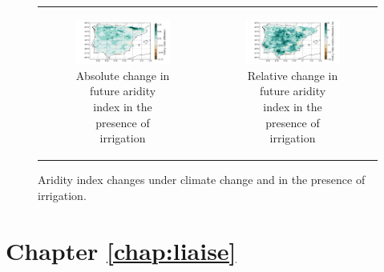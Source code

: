 \begin{figure}[htbp]
\begin{tabular}{cc}
        \begin{subfigure}[b]{0.5\textwidth}
            \caption{Absolute change in future aridity index in the presence of irrigation}
            \includegraphics[width=\textwidth]{images/chap4/future/diffmap_aridity_index_futirr.png}
        \end{subfigure} &
        \begin{subfigure}[b]{0.5\textwidth}
            \caption{Relative change in future aridity index in the presence of irrigation}
            \includegraphics[width=\textwidth]{images/chap4/future/reldiffmap_aridity_index_futirr.png}
        \end{subfigure} \\
    \end{tabular}
    \caption{Aridity index changes under climate change and in the presence of irrigation.}
    \label{fig:diffmaps_aridity}
\end{figure}

\section*{Chapter \ref{chap:liaise}}

